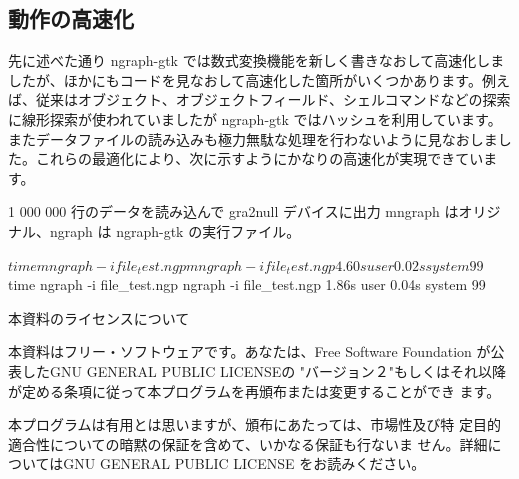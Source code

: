 \documentclass[mingoth,a4paper,twoside]{jsarticle}
\begin{document}
\subsection{動作の高速化}

先に述べた通り ngraph-gtk では数式変換機能を新しく書きなおして高速化しま
したが、ほかにもコードを見なおして高速化した箇所がいくつかあります。例え
ば、従来はオブジェクト、オブジェクトフィールド、シェルコマンドなどの探索
に線形探索が使われていましたが ngraph-gtk ではハッシュを利用しています。
またデータファイルの読み込みも極力無駄な処理を行わないように見なおしまし
た。これらの最適化により、次に示すようにかなりの高速化が実現できています。

\begin{commandline}
 1 000 000 行のデータを読み込んで gra2null デバイスに出力
 mngraph はオリジナル、ngraph は ngraph-gtk の実行ファイル。

 $ time mngraph -i file_test.ngp
 mngraph -i file_test.ngp  4.60s user 0.02s system 99%
 $ time ngraph -i file_test.ngp
 ngraph -i file_test.ngp  1.86s user 0.04s system 99%
\end{commandline}


\pagebreak

\begin{center}
本資料のライセンスについて
\end{center}

本資料はフリー・ソフトウェアです。あなたは、Free Software
Foundation が公表したGNU GENERAL PUBLIC LICENSEの "バージョン２"もしくはそれ以降
が定める条項に従って本プログラムを再頒布または変更することができ
ます。

本プログラムは有用とは思いますが、頒布にあたっては、市場性及び特
定目的適合性についての暗黙の保証を含めて、いかなる保証も行ないま
せん。詳細についてはGNU GENERAL PUBLIC LICENSE をお読みください。
\end{document}
